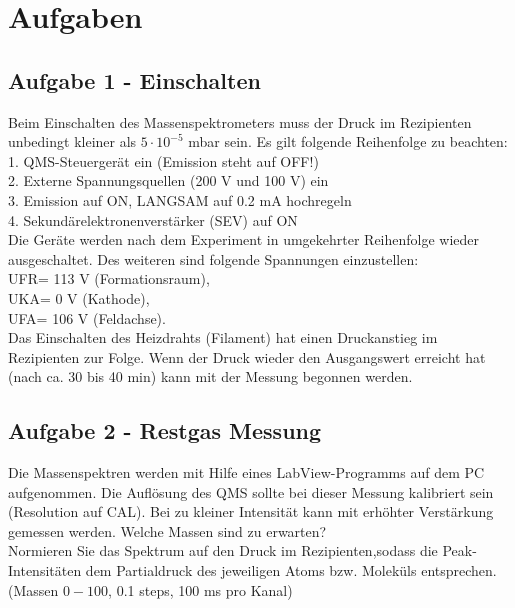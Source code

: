 \newpage
\section{Aufgaben}
\subsection*{Aufgabe 1 - Einschalten}
Beim Einschalten des Massenspektrometers muss der Druck im Rezipienten unbedingt kleiner als $5 \cdot 10^{-5}$ mbar sein. Es gilt folgende Reihenfolge zu beachten:\\ 
1. QMS-Steuergerät ein (Emission steht auf OFF!)\\ 
2. Externe Spannungsquellen (200 V und 100 V) ein\\ 
3. Emission auf ON, LANGSAM auf 0.2 mA hochregeln\\ 
4. Sekundärelektronenverstärker (SEV) auf ON\\
Die Geräte werden nach dem Experiment in umgekehrter Reihenfolge wieder ausgeschaltet. Des weiteren sind folgende Spannungen einzustellen:\\ 
UFR= 113 V   (Formationsraum), \\
UKA= 0 V   (Kathode), \\
UFA= 106 V   (Feldachse). \\
Das Einschalten des Heizdrahts (Filament) hat einen Druckanstieg im Rezipienten zur Folge. Wenn der Druck wieder den Ausgangswert erreicht hat (nach ca. 30 bis 40 min) kann mit der Messung begonnen werden. \\

\subsection*{Aufgabe 2 - Restgas Messung} 
Die Massenspektren werden mit Hilfe eines LabView-Programms auf dem PC aufgenommen. Die Auflösung des QMS sollte bei dieser Messung kalibriert sein (Resolution auf CAL). Bei zu kleiner Intensität kann mit erhöhter Verstärkung gemessen werden. Welche Massen sind zu erwarten? \\
Normieren Sie das Spektrum auf den Druck im Rezipienten,sodass die Peak-Intensitäten dem Partialdruck des jeweiligen Atoms bzw. Moleküls entsprechen. (Massen $0-100$, 0.1 steps, 100 ms pro Kanal) 

